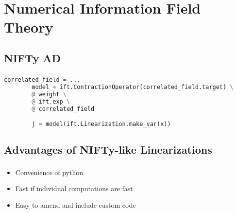 \documentclass[aspectratio=169,xcolor=dvipsnames]{beamer}
\begin{document}
\section{Numerical Information Field Theory}  %




\subsection{NIFTy AD}
\begin{frame}[fragile]
	\frametitle{\insertsection}
	\framesubtitle{\insertsubsection}

	\begin{lstlisting}[language=python,escapechar=!]
		correlated_field = ...
		model = ift.ContractionOperator(correlated_field.target) \
		@ weight \
		@ ift.exp \
		@ correlated_field

		j = model(ift.Linearization.make_var(x))
	\end{lstlisting}

\end{frame}

\subsection{Advantages of NIFTy-like Linearizations}
\begin{frame}
	\frametitle{\insertsection}
	\framesubtitle{\insertsubsection}

	\begin{itemize}
		\item Convenience of python
		\item Fast if individual computations are fast
		\item Easy to amend and include custom code
	\end{itemize}

\end{frame}
\end{document}
